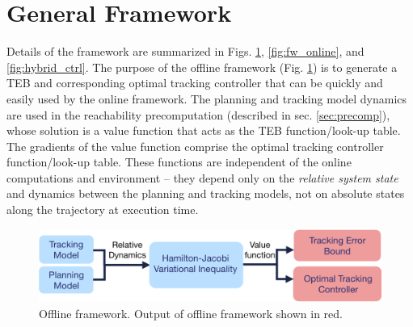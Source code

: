 \section{General Framework \label{sec:framework}}
Details of the framework are summarized in Figs. \ref{fig:fw_offline}, \ref{fig:fw_online}, and \ref{fig:hybrid_ctrl}. 
The purpose of the offline framework (Fig. \ref{fig:fw_offline}) is to generate a TEB and corresponding optimal tracking controller that can be quickly and easily used by the online framework.
The planning and tracking model dynamics are used in the reachability precomputation (described in sec. \ref{sec:precomp}), whose solution is a value function that acts as the TEB function/look-up table. 
The gradients of the value function comprise the optimal tracking controller function/look-up table. 
These functions are independent of the online computations and environment -- they depend only on the \textit{relative system state} and dynamics between the planning and tracking models, not on absolute states along the trajectory at execution time.

\begin{figure}[h!]
	\centering
	\includegraphics[width=1\columnwidth]{fig/framework_offline_2}
	\caption{Offline framework. Output of offline framework shown in red.}
	\label{fig:fw_offline}
\end{figure}

